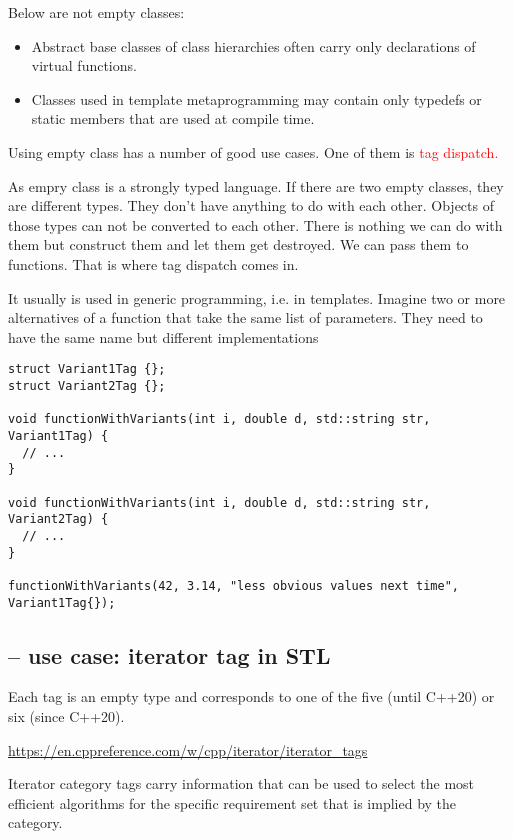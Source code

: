 Below are not empty classes: 
\begin{itemize}
  \item  Abstract base classes of class hierarchies often carry only declarations of
virtual functions. 

  \item Classes used in template metaprogramming may contain only
typedefs or static members that are used at compile time.
 
\end{itemize}

Using empty class has a number of good use cases.
One of them is \textcolor{red}{tag dispatch.}

As empry class is a strongly typed language. If there are two empty classes,
they are different types. They don’t have anything to do with each other.
Objects of those types can not be converted to each other. There is nothing we
can do with them but construct them and let them get destroyed.
We can pass them to functions. That is where tag dispatch comes in.

 It usually is used in generic programming, i.e. in templates. Imagine two or
 more alternatives of a function that take the same list of parameters. They
 need to have the same name but different implementations
\begin{verbatim}
struct Variant1Tag {};
struct Variant2Tag {};

void functionWithVariants(int i, double d, std::string str, Variant1Tag) {
  // ...
}

void functionWithVariants(int i, double d, std::string str, Variant2Tag) {
  // ...
}

functionWithVariants(42, 3.14, "less obvious values next time", Variant1Tag{});

\end{verbatim}

\subsection{-- use case: iterator tag in STL}

Each tag is an empty type and corresponds to one of the five (until C++20) or six (since C++20).

\url{https://en.cppreference.com/w/cpp/iterator/iterator_tags}

Iterator category tags carry information that can be used to select the most
efficient algorithms for the specific requirement set that is implied by the
category.

